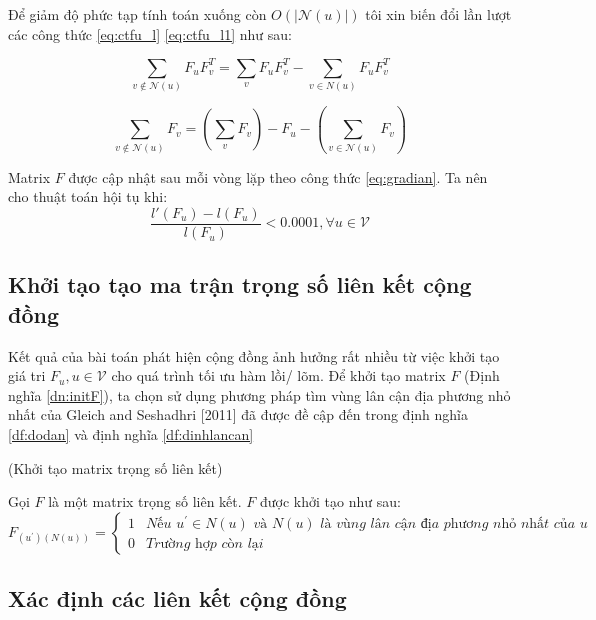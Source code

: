 Để giảm độ phức tạp tính toán xuống còn $O(|\mathcal{N}(u)|)$ tôi xin biến đổi lần lượt các công thức \ref{eq:ctfu_l} \ref{eq:ctfu_l1} như sau:

\begin{equation}\label{eq:caitien}
\sum_{v \notin \mathcal{N}(u)} {F_u F_v^T}= \sum_{v} {F_u F_v^T} - \sum_{v \in N(u)} {F_u F_v^T}
\end{equation}

\begin{equation}\label{eq:caitien1}
\sum_{v \notin \mathcal{N}(u)} {F_v}= \left(\sum_{v} {F_v}\right) - F_u - \left(\sum_{v \in \mathcal{N}(u)} {F_v}\right)
\end{equation}

Matrix $F$ được cập nhật sau mỗi vòng lặp theo công thức \ref{eq:gradian}. Ta nên cho thuật toán hội tụ khi:
 \begin{equation}
 \dfrac{l'{(F_u)} - l(F_u)}{l(F_u)} < 0.0001, \forall u \in \mathcal{V}
 \end{equation}

\subsection{Khởi tạo tạo ma trận trọng số liên kết cộng đồng}
Kết quả của bài toán phát hiện cộng đồng ảnh hưởng rất nhiều từ việc khởi tạo giá tri $F_u, u\in \mathcal{V}$ cho quá trình tối ưu hàm lồi/ lõm. Để khởi tạo matrix $F$ (Định nghĩa \ref{dn:initF}), ta chọn sử dụng phương pháp tìm vùng lân cận địa phương nhỏ nhất của Gleich and Seshadhri [2011] \cite{DBLP:journals/corr/abs-1112-0031} đã được đề cập đến trong định nghĩa \ref{df:dodan} và định nghĩa \ref{df:dinhlancan}

\begin{definition}(Khởi tạo matrix trọng số liên kết)\label{dn:initF}
	
	Gọi $F$ là một matrix trọng số liên kết. $F$ được khởi tạo như sau:
	\begin{equation}
		F_{(u^{\prime})(N(u))} =
			\begin{cases}
			1 & \textit{Nếu $u^{\prime} \in N(u)$ và $N(u)$ là vùng lân cận địa phương nhỏ nhất của $u$} \\
			0 & \textit{Trường hợp còn lại}
			\end{cases}
	\end{equation}
\end{definition}
\subsection{Xác định các liên kết cộng đồng}


